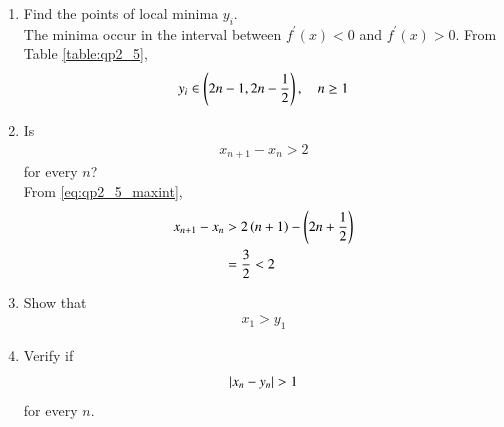 \documentclass[journal,12pt,twocolumn]{IEEEtran}
\renewcommand\thesection{\arabic{section}}
\begin{document}
\begin{enumerate}[label=\thesection.\arabic*
,ref=\thesection.\theenumi]
\item Find  the points of local minima $y_i$.
\\
\solution The minima occur in the interval between  $f^{\prime}(x) < 0 $ and $f^{\prime}(x) > 0 $.  From Table \ref{table:qp2_5}, 
\begin{align}
\label{eq:qp2_5_minint}
y_i \in \left(2n-1, 2n-\frac{1}{2}\right), \quad n \ge 1
\end{align}
%
\item Is 
\begin{align}
x_{n+1} - x_n > 2 
\end{align}
for every $n$?
\\
\solution From \eqref{eq:qp2_5_maxint},
\begin{align}
x_{n+1} - x_n &> 2\left(n+1\right)-\left(2n+\frac{1}{2}\right)
\\
&=\frac{3}{2} < 2
\end{align}

\item Show that 
\begin{align}
x_1 > y_1
\end{align}
\item Verify if 
\begin{align}
\left\vert x_n-y_n\right\vert > 1 
\end{align}
for every $n$.

\end{enumerate}
\end{document}
